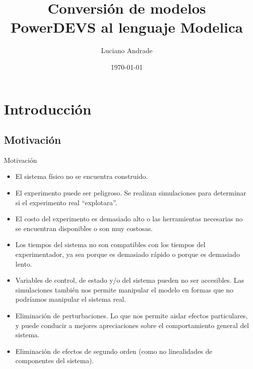 \documentclass{beamer}
\title{Conversión de modelos PowerDEVS al lenguaje Modelica} %
\author{Luciano Andrade} %
\institute[UNR] %
{
Universidad Nacional de Rosario\\ %
\medskip
\textit{andrade.luciano@gmail.com} %
}
\date{\today} %
\begin{document}
\newcommand{\quotes}[1]{``#1''}

\begin{frame}
\titlepage %
\end{frame}


\chapter{Introducción}
\section{Motivación}
\begin{frame}{Motivación}
\begin{itemize}
	\item<1-> El sistema físico no se encuentra construido. 
	
	\item<2-> El experimento puede ser peligroso. Se realizan simulaciones para determinar si el experimento real \quotes{explotara}.

	\item<3-> El costo del experimento es demasiado alto o las herramientas necesarias no se encuentran disponibles o son muy costosas.

	\item<4-> Los tiempos del sistema no son compatibles con los tiempos del experimentador, ya sea porque es demasiado rápido o porque es demasiado lento.

	\item<5-> Variables de control, de estado y/o del sistema pueden no ser accesibles. Las simulaciones también nos permite manipular el modelo en formas que no podríamos manipular el sistema real.

	\item<6-> Eliminación de perturbaciones. Lo que nos permite aislar efectos particulares, y puede conducir a mejores apreciaciones sobre el comportamiento general del sistema.

	\item<7-> Eliminación de efectos de segundo orden (como no linealidades de componentes del sistema). 
\end{itemize}
\end{frame}
\end{document}
